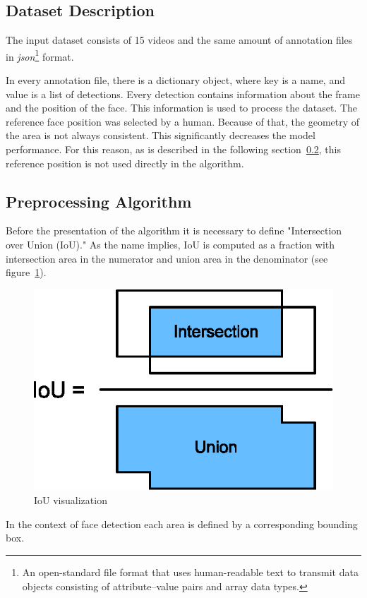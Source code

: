 \subsection{Dataset Description}\label{subsec:dataset-description}
The input dataset consists of 15 videos and the same amount of annotation files in \textit{json}\footnote{An
open-standard file format that uses human-readable text to transmit data objects consisting of attribute–value pairs
and array data types.} format.

In every annotation file, there is a dictionary object, where key is a name, and value is a list of detections.
Every detection contains information about the frame and the position of the face.
This information is used to process the dataset.
The reference face position was selected by a human.
Because of that, the geometry of the area is not always consistent.
This significantly decreases the model performance.
For this reason, as is described in the following section~\ref{subsec:preproalgo}, this reference position is not
used directly in the algorithm.

\subsection{Preprocessing Algorithm}\label{subsec:preproalgo}
Before the presentation of the algorithm it is necessary to define "Intersection over Union (IoU)."
As the name implies, IoU is computed as a fraction with intersection area in the numerator and union area in the
denominator (see figure~\ref{fig:iou}).
\begin{figure}[H]
    \centering
    \includegraphics{images/implementation/iou.eps}
    \caption{IoU visualization\cite{IoU}}
    \label{fig:iou}
\end{figure}
In the context of face detection each area is defined by a corresponding bounding box.

